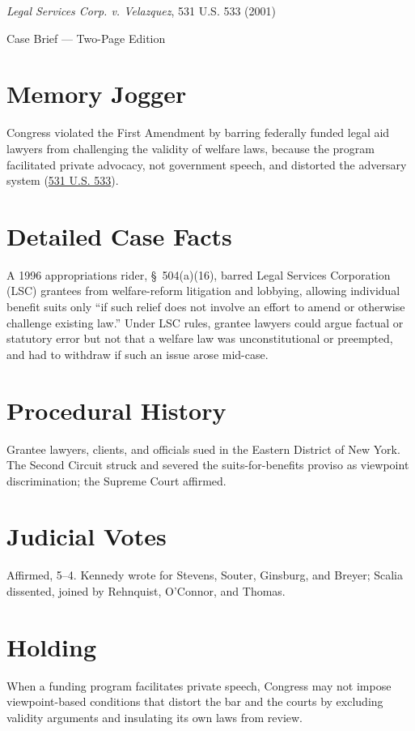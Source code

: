 \documentclass[12pt]{article}
\begin{document}
\begin{center}
{\LARGE \textit{Legal Services Corp. v. Velazquez}, 531 U.S. 533 (2001)\par}
\vspace{0.5em}
{\large Case Brief --- Two-Page Edition\par}
\end{center}

\section{Memory Jogger}
Congress violated the First Amendment by barring federally funded legal aid lawyers from challenging the validity of welfare laws, because the program facilitated private advocacy, not government speech, and distorted the adversary system (\href{https://supreme.justia.com/cases/federal/us/531/533/}{531 U.S. 533}).

\section{Detailed Case Facts}
A 1996 appropriations rider, \S~504(a)(16), barred Legal Services Corporation (LSC) grantees from welfare-reform litigation and lobbying, allowing individual benefit suits only ``if such relief does not involve an effort to amend or otherwise challenge existing law.'' Under LSC rules, grantee lawyers could argue factual or statutory error but not that a welfare law was unconstitutional or preempted, and had to withdraw if such an issue arose mid-case.

\section{Procedural History}
Grantee lawyers, clients, and officials sued in the Eastern District of New York. The Second Circuit struck and severed the suits-for-benefits proviso as viewpoint discrimination; the Supreme Court affirmed.

\section{Judicial Votes}
Affirmed, 5--4. Kennedy wrote for Stevens, Souter, Ginsburg, and Breyer; Scalia dissented, joined by Rehnquist, O'Connor, and Thomas.

\section{Holding}
When a funding program facilitates private speech, Congress may not impose viewpoint-based conditions that distort the bar and the courts by excluding validity arguments and insulating its own laws from review.
\end{document}
